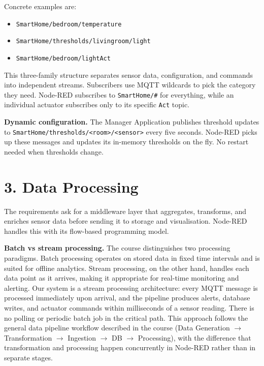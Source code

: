 \documentclass[a4paper,12pt]{report}
\begin{document}
Concrete examples are:
\begin{itemize}
  \item \texttt{SmartHome/bedroom/temperature}
  \item \texttt{SmartHome/thresholds/livingroom/light}
  \item \texttt{SmartHome/bedroom/lightAct}
\end{itemize}
This three-family structure separates
sensor data, configuration, and commands into independent streams.
Subscribers use MQTT wildcards to pick the category they need. Node-RED
subscribes to \texttt{SmartHome/\#} for everything, while an individual
actuator subscribes only to its specific \texttt{Act} topic.

\textbf{Dynamic configuration.} The Manager Application publishes threshold
updates to \texttt{SmartHome/thresholds/<room>/<sensor>} every five seconds.
Node-RED picks up these messages and updates its in-memory thresholds on the
fly. No restart needed when thresholds change.

\section*{3. Data Processing}

The requirements ask for a middleware layer that aggregates, transforms, and
enriches sensor data before sending it to storage and visualisation. Node-RED
handles this with its flow-based programming model.

\textbf{Batch vs stream processing.} The course distinguishes two processing
paradigms. Batch processing operates on stored data in fixed time intervals
and is suited for offline analytics. Stream processing, on the other hand,
handles each data point as it arrives, making it appropriate for real-time
monitoring and alerting. Our system is a stream processing architecture: every
MQTT message is processed immediately upon arrival, and the pipeline produces
alerts, database writes, and actuator commands within milliseconds of a sensor
reading. There is no polling or periodic batch job in the critical path. This
approach follows the general data pipeline workflow described in the course
(Data Generation $\rightarrow$ Transformation $\rightarrow$ Ingestion
$\rightarrow$ DB $\rightarrow$ Processing), with the difference that
transformation and processing happen concurrently in Node-RED rather than in
separate stages.
\end{document}
